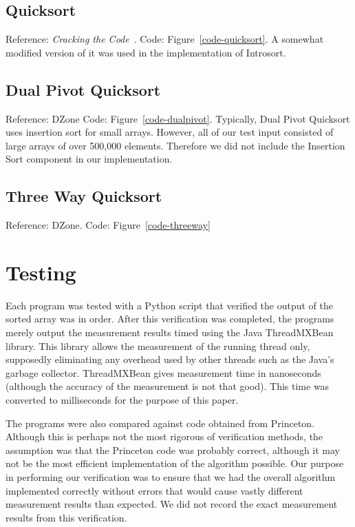 \documentclass{article}
\begin{document}
\subsection{Quicksort}
Reference: \textit{Cracking the Code}~\cite{McDowell}. 
Code: Figure~\ref{code-quicksort}. 
A somewhat modified version of it was used in the implementation of Introsort.

\subsection{Dual Pivot Quicksort}
Reference: DZone\cite{DZone}
Code: Figure~\ref{code-dualpivot}. 
Typically, Dual Pivot Quicksort uses insertion sort for small
arrays. However, all of our test input consisted of large arrays of over 500,000 elements.
Therefore we did not include the Insertion Sort component in our implementation.

\subsection{Three Way Quicksort}
Reference: DZone\cite{DZone}. 
Code: Figure~\ref{code-threeway}

\section{Testing}
Each program was tested with a Python script that verified the output of the sorted array
was in order. After this verification was completed, the programs merely output the
measurement results timed using the Java ThreadMXBean library. This library allows
the measurement of the running thread only, supposedly eliminating any overhead
used by other threads such as the Java's garbage collector. ThreadMXBean gives
measurement time in nanoseconds (although the accuracy of the measurement is 
not that good). This time was converted to milliseconds for the purpose of this paper.

The programs were also compared against code obtained from
Princeton\cite{Princeton}. Although this is perhaps not the most rigorous of verification methods,
the assumption was that the Princeton code was probably correct, although it may not be
the most efficient implementation of the algorithm possible. Our purpose in performing
our verification was to ensure that we had the overall algorithm implemented correctly
without errors that would cause vastly different measurement results than expected. We 
did not record the exact measurement results from this verification.
\end{document}
